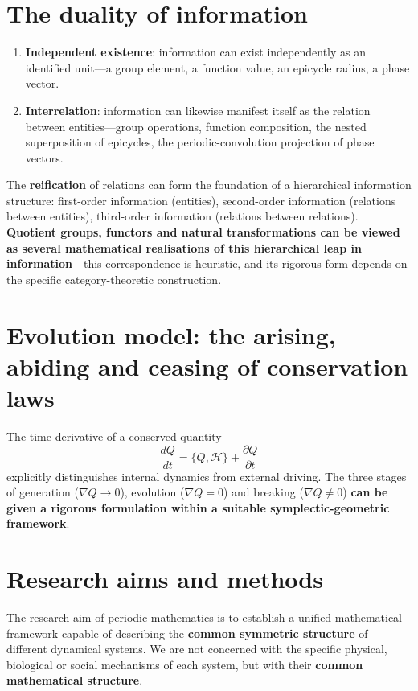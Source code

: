 \section*{The duality of information}

\begin{enumerate}[leftmargin=4em, label={(\arabic*)}]
    \item \textbf{Independent existence}: information can exist independently as an identified unit---a group element, a function value, an epicycle radius, a phase vector.
    \item \textbf{Interrelation}: information can likewise manifest itself as the relation between entities---group operations, function composition, the nested superposition of epicycles, the periodic-convolution projection of phase vectors.
\end{enumerate}

The \textbf{reification} of relations can form the foundation of a hierarchical information structure: first-order information (entities), second-order information (relations between entities), third-order information (relations between relations). \textbf{Quotient groups, functors and natural transformations can be viewed as several mathematical realisations of this hierarchical leap in information}---this correspondence is heuristic, and its rigorous form depends on the specific category-theoretic construction.

\section*{Evolution model: the arising, abiding and ceasing of conservation laws}

The time derivative of a conserved quantity
\[
\frac{dQ}{dt} = \{Q, \mathcal{H}\} + \frac{\partial Q}{\partial t}
\]
explicitly distinguishes internal dynamics from external driving. The three stages of generation ($\nabla Q \to 0$), evolution ($\nabla Q = 0$) and breaking ($\nabla Q \neq 0$) \textbf{can be given a rigorous formulation within a suitable symplectic-geometric framework}.

\section*{Research aims and methods}

The research aim of periodic mathematics is to establish a unified mathematical framework capable of describing the \textbf{common symmetric structure} of different dynamical systems. We are not concerned with the specific physical, biological or social mechanisms of each system, but with their \textbf{common mathematical structure}.

